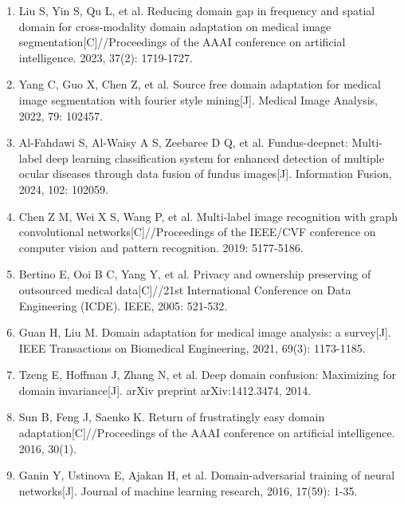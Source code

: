 \begin{enumerate}
  \protect{}\label{_Ref213949340}{}Lin T Y, Maire M, Belongie S, et al. Microsoft coco: Common objects in context{[}C{]}//European conference on computer vision. Cham: Springer International Publishing, 2014: 740-755.
\item
  \protect{}\label{_Ref213949348}{}Liu S, Yin S, Qu L, et al. Reducing domain gap in frequency and spatial domain for cross-modality domain adaptation on medical image segmentation{[}C{]}//Proceedings of the AAAI conference on artificial intelligence. 2023, 37(2): 1719-1727.
\item
  \protect{}\label{_Ref213949354}{}Yang C, Guo X, Chen Z, et al. Source free domain adaptation for medical image segmentation with fourier style mining{[}J{]}. Medical Image Analysis, 2022, 79: 102457.
\item
  \protect{}\label{_Ref213949362}{}Al-Fahdawi S, Al-Waisy A S, Zeebaree D Q, et al. Fundus-deepnet: Multi-label deep learning classification system for enhanced detection of multiple ocular diseases through data fusion of fundus images{[}J{]}. Information Fusion, 2024, 102: 102059.
\item
  \protect{}\label{_Ref213949382}{}Chen Z M, Wei X S, Wang P, et al. Multi-label image recognition with graph convolutional networks{[}C{]}//Proceedings of the IEEE/CVF conference on computer vision and pattern recognition. 2019: 5177-5186.
\item
  \protect{}\label{_Ref213949393}{}Bertino E, Ooi B C, Yang Y, et al. Privacy and ownership preserving of outsourced medical data{[}C{]}//21st International Conference on Data Engineering (ICDE). IEEE, 2005: 521-532.
\item
  \protect{}\label{_Ref213949439}{}Guan H, Liu M. Domain adaptation for medical image analysis: a survey{[}J{]}. IEEE Transactions on Biomedical Engineering, 2021, 69(3): 1173-1185.
\item
  \protect{}\label{_Ref213949448}{}Tzeng E, Hoffman J, Zhang N, et al. Deep domain confusion: Maximizing for domain invariance{[}J{]}. arXiv preprint arXiv:1412.3474, 2014.
\item
  \protect{}\label{_Ref213949453}{}Sun B, Feng J, Saenko K. Return of frustratingly easy domain adaptation{[}C{]}//Proceedings of the AAAI conference on artificial intelligence. 2016, 30(1).
\item
  \protect{}\label{_Ref213949479}{}Ganin Y, Ustinova E, Ajakan H, et al. Domain-adversarial training of neural networks{[}J{]}. Journal of machine learning research, 2016, 17(59): 1-35.

\end{enumerate}
